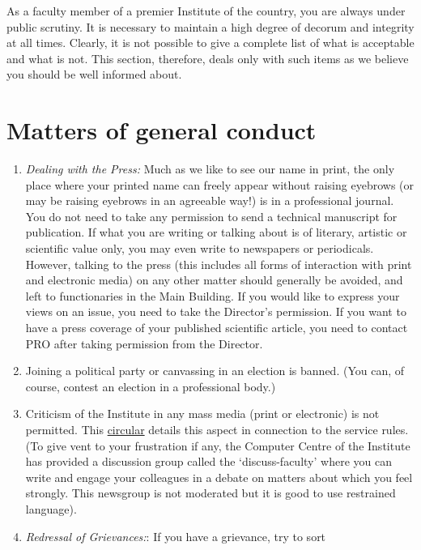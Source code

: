 \documentclass[
  10pt,
  a5paper,
  10pt,
  openany]{amsbook}
\providecommand{\tightlist}{%
  \setlength{\itemsep}{0pt}\setlength{\parskip}{0pt}}
\begin{document}
As a faculty member of a premier Institute of the country, you are
always under public scrutiny. It is necessary to maintain a high degree
of decorum and integrity at all times. Clearly, it is not possible to
give a complete list of what is acceptable and what is not. This
section, therefore, deals only with such items as we believe you should
be well informed about.

\section{Matters of general conduct}\label{matters-of-general-conduct}

\begin{enumerate}
\def\labelenumi{\arabic{enumi}.}
\tightlist
\item
  \emph{Dealing with the Press:} Much as we like to see our name in
  print, the only place where your printed name can freely appear
  without raising eyebrows (or may be raising eyebrows in an agreeable
  way!) is in a professional journal. You do not need to take any
  permission to send a technical manuscript for publication. If what you
  are writing or talking about is of literary, artistic or scientific
  value only, you may even write to newspapers or periodicals. However,
  talking to the press (this includes all forms of interaction with
  print and electronic media) on any other matter should generally be
  avoided, and left to functionaries in the Main Building. If you would
  like to express your views on an issue, you need to take the
  Director's permission. If you want to have a press coverage of your
  published scientific article, you need to contact PRO after taking
  permission from the Director.
\item
  Joining a political party or canvassing in an election is banned. (You
  can, of course, contest an election in a professional body.)
\item
  Criticism of the Institute in any mass media (print or electronic) is
  not permitted. This
  \href{https://bighome.iitb.ac.in/index.php/s/LDFrcxW7Bdoa6wZ}{circular}
  details this aspect in connection to the service rules. (To give vent
  to your frustration if any, the Computer Centre of the Institute has
  provided a discussion group called the `discuss-faculty' where you can
  write and engage your colleagues in a debate on matters about which
  you feel strongly. This newsgroup is not moderated but it is good to
  use restrained language).
\item
  \emph{Redressal of Grievances:}: If you have a grievance, try to sort

\end{enumerate}
\end{document}
